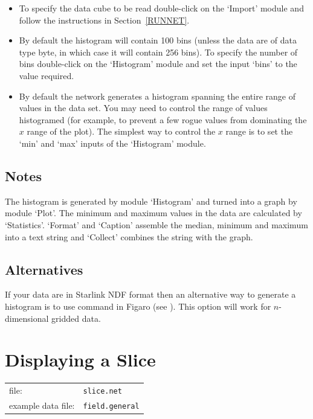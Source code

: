 \documentclass[twoside,11pt]{starlink}
\begin{document}
\begin{itemize}

  \item To specify the data cube to be read double-click on the `Import'
   module and follow the instructions in Section~\ref{RUNNET}.

  \item By default the histogram will contain 100 bins (unless the data
   are of data type byte, in which case it will contain 256 bins). To
   specify the number of bins double-click on the `Histogram' module
   and set the input `bins' to the value required.

  \item By default the network generates a histogram spanning the
   entire range of values in the data set. You may need to control
   the range of values histogramed (for example, to prevent a few
   rogue values from dominating the $x$ range of the plot). The
   simplest way to control the $x$ range is to set the `min' and `max'
   inputs of the `Histogram' module.

\end{itemize}

\subsection{Notes}

The histogram is generated by module `Histogram' and turned into a graph
by module `Plot'. The minimum and maximum values in the data are
calculated by `Statistics'. `Format' and `Caption' assemble the median,
minimum and maximum into a text string and `Collect' combines the string
with the graph.

\subsection{Alternatives}

If your data are in Starlink NDF format then an alternative way to
generate a histogram is to use command  in
Figaro (see \cite{SUN86}).  This option will work
for $n$-dimensional gridded data.


\newpage
\section{\label{SLICNET}Displaying a Slice}


\begin{tabular}{ll}
file:              & \texttt{slice.net}     \\
example data file: & \texttt{field.general} \\
\end{tabular}
\end{document}
